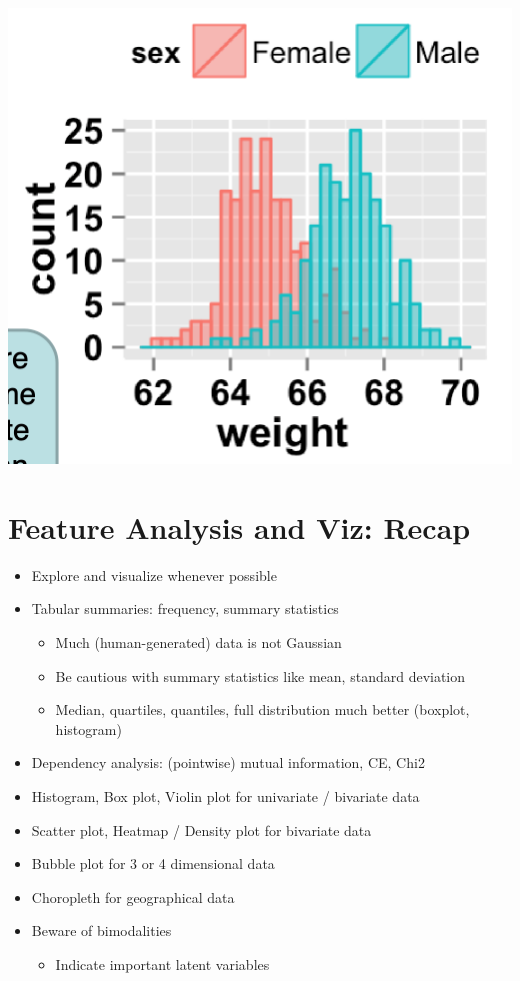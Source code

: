 \documentclass[11pt]{article}
\theoremstyle{definition}
\begin{document}
\includegraphics[width=\textwidth/4]{33.png}

\section{Feature Analysis and Viz: Recap}
\begin{itemize}
  \item Explore and visualize whenever possible
  \item Tabular summaries: frequency, summary statistics
  \begin{itemize}
    \item Much (human-generated) data is not Gaussian
    \item Be cautious with summary statistics like mean, standard deviation
    \item Median, quartiles, quantiles, full distribution much better (boxplot, histogram)
  \end{itemize}
  \item Dependency analysis: (pointwise) mutual information, CE, Chi2
  \item Histogram, Box plot, Violin plot for univariate / bivariate data
  \item Scatter plot, Heatmap / Density plot for bivariate data
  \item Bubble plot for 3 or 4 dimensional data
  \item Choropleth for geographical data
  \item Beware of bimodalities
  \begin{itemize}
    \item Indicate important latent variables
  \end{itemize}
\end{itemize}
\end{document}
